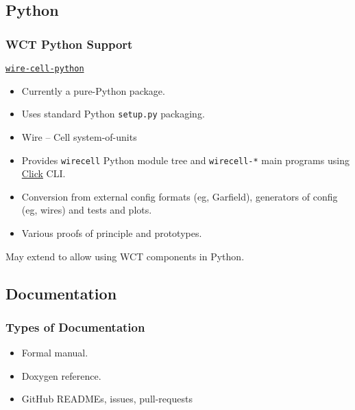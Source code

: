 \documentclass[xcolor=dvipsnames]{beamer}
\def\wc{Wire -- Cell\xspace}
\begin{document}
\subsection{Python}

\begin{frame}
  \tableofcontents[
  currentsection,
  currentsubsection,        
  subsectionstyle=show/shaded/hide]
\end{frame}

\begin{frame}
  \frametitle{WCT Python Support}


  \href{https://github.com/wirecell/wire-cell-python}{\texttt{wire-cell-python}}
  
  \begin{itemize}
  \item Currently a pure-Python package.
  \item Uses standard Python \texttt{setup.py} packaging.
  \item \wc system-of-units
  \item Provides \texttt{wirecell} Python module tree and
    \texttt{wirecell-*} main programs using
    \href{http://click.pocoo.org/}{Click} CLI.
  \item Conversion from external config formats (eg, Garfield),
    generators of config (eg, wires) and tests and plots.
  \item Various proofs of principle and prototypes.
  \end{itemize}

  \vfill
  \footnotesize
  May extend to allow using WCT components in Python.

\end{frame}

\subsection{Documentation}

\begin{frame}
  \tableofcontents[
  currentsection,
  currentsubsection,        
  subsectionstyle=show/shaded/hide]
\end{frame}

\begin{frame}
  \frametitle{Types of Documentation}
  \begin{itemize}
  \item Formal manual.
  \item Doxygen reference.
  \item GitHub READMEs, issues, pull-requests
  \end{itemize}
\end{frame}
\end{document}
